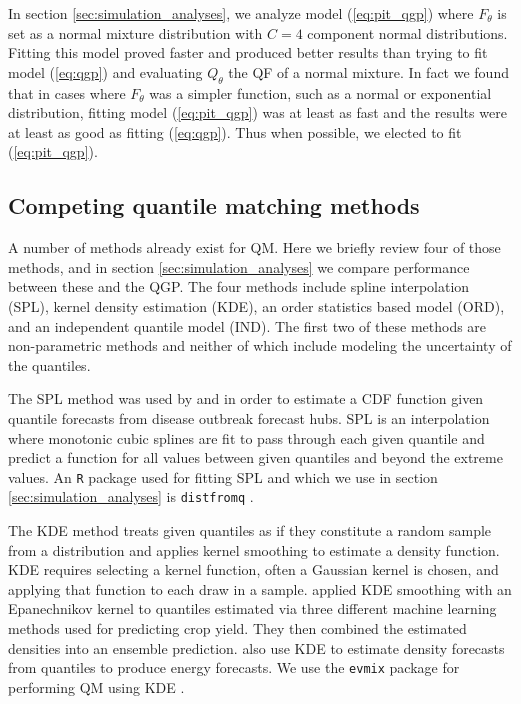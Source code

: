 \documentclass[preprint,12pt,authoryear]{elsarticle}
\begin{document}
In section \ref{sec:simulation_analyses}, we analyze model (\ref{eq:pit_qgp}) where $F_{\theta}$ is set as a normal mixture distribution with $C = 4$ component normal distributions. Fitting this model proved faster and produced better results than trying to fit model (\ref{eq:qgp}) and evaluating $Q_{\theta}$ the QF of a normal mixture. In fact we found that in cases where $F_{\theta}$ was a simpler function, such as a normal or exponential distribution, fitting model (\ref{eq:pit_qgp}) was at least as fast and the results were at least as good as fitting (\ref{eq:qgp}). Thus when possible, we elected to fit (\ref{eq:pit_qgp}).  



 




\subsection{Competing quantile matching methods}

A number of methods already exist for QM. Here we briefly review four of those methods, and in section \ref{sec:simulation_analyses} we compare performance between these and the QGP. The four methods include spline interpolation (SPL), kernel density estimation (KDE), an order statistics based model (ORD), and an independent quantile model (IND). The first two of these methods are non-parametric methods and neither of which include modeling the uncertainty of the quantiles.

The SPL method was used by \cite{gerding2023evaluating} and \cite{shandross2024hubensembles} in order to estimate a CDF function given quantile forecasts from disease outbreak forecast hubs. SPL is an interpolation where monotonic cubic splines are fit to pass through each given quantile and predict a function for all values between given quantiles and beyond the extreme values. An \texttt{R} package used for fitting SPL and which we use in section \ref{sec:simulation_analyses} is \texttt{distfromq} \cite[]{ray2024quantmatch}.

The KDE method treats given quantiles as if they constitute a random sample from a distribution and applies kernel smoothing to estimate a density function. KDE requires selecting a kernel function, often a Gaussian kernel is chosen, and applying that function to each draw in a sample. \cite{gyamerah2020probabilistic} applied KDE smoothing with an Epanechnikov kernel to quantiles estimated via three different machine learning methods used for predicting crop yield. They then combined the estimated densities into an ensemble prediction. \cite{he2016short} also use KDE to estimate density forecasts from quantiles to produce energy forecasts. We use the \texttt{evmix} package for performing QM using KDE \cite[]{yang2018kde}.
\end{document}
